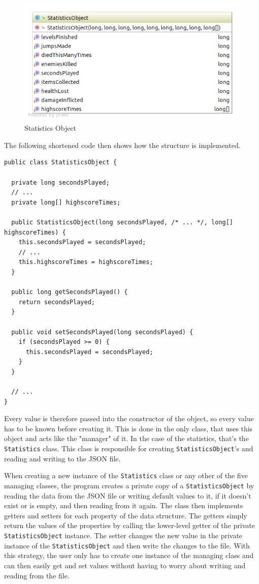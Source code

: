 \documentclass[12p]{article}
\begin{document}
\begin{figure}[ht]
 \center
 \includegraphics[width=1\textwidth]{Documentation/StatisticsObject.png}
 \caption{Statistics Object}
 \label{fig:StatisticsObjectUML}
\end{figure}

The following shortened code then shows how the structure is implemented.

\begin{verbatim}
public class StatisticsObject {

  private long secondsPlayed;
  // ...
  private long[] highscoreTimes;
  
  public StatisticsObject(long secondsPlayed, /* ... */, long[] highscoreTimes) {
    this.secondsPlayed = secondsPlayed;
    // ...
    this.highscoreTimes = highscoreTimes;
  }
  
  public long getSecondsPlayed() {
    return secondsPlayed;
  }

  public void setSecondsPlayed(long secondsPlayed) {
    if (secondsPlayed >= 0) {
      this.secondsPlayed = secondsPlayed;
    }
  }
  
  // ...
}
\end{verbatim}

Every value is therefore passed into the constructor of the object, so every value has to be known before creating it. This is done in the only class, that uses this object and acts like the "manager" of it. In the case of the statistics, that's the \texttt{Statistics} class. This class is responsible for creating \texttt{StatisticsObject}'s and reading and writing to the JSON file.

When creating a new instance of the \texttt{Statistics} class or any other of the five managing classes, the program creates a private copy of a \texttt{StatisticsObject} by reading the data from the JSON file or writing default values to it, if it doesn't exist or is empty, and then reading from it again. The class then implements getters and setters for each property of the data structure. The getters simply return the values of the properties by calling the lower-level getter of the private \texttt{StatisticsObject} instance. The setter changes the new value in the private instance of the \texttt{StatisticsObject} and then write the changes to the file. With this strategy, the user only has to create one instance of the managing class and can then easily get and set values without having to worry about writing and reading from the file.
\end{document}
